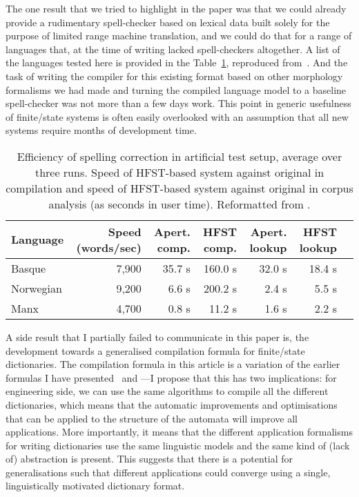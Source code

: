 \documentclass[officiallayout]{unihelcompling}
\begin{document}
The one result that we tried to highlight in the paper was that we could
already provide a rudimentary spell-checker based on lexical data built solely
for the purpose of limited range machine translation, and we could do that for
a range of languages that, at the time of writing lacked spell-checkers
altogether. A list of the languages tested here is provided in the
Table~\ref{table:lrec-2012-repro}, reproduced
from~. And the task of writing the compiler
for this existing format based on other morphology formalisms we had made and
turning the compiled language model to a baseline spell-checker was not more
than a few days work. This point in generic usefulness of finite\-/state
systems is often easily overlooked with an assumption that all new systems
require months of development time.

\begin{table}
    \centering
    \begin{scriptsize}
\begin{tabular}{|l|r|r||r|r||r|r|}
\hline
\bf Language & \bf Speed (words/sec) & \bf Apert. comp. & \bf HFST comp. & \bf Apert. lookup & \bf HFST lookup \\
\hline
Basque       &  7,900  & 35.7 s & 160.0  s & 32.0 s & 18.4 s \\
Norwegian    &  9,200  & 6.6 s  & 200.2 s  & 2.4 s  & 5.5  s \\
Manx         &  4,700  & 0.8 s  & 11.2  s  & 1.6 s  & 2.2  s \\
\hline
\end{tabular}
\end{scriptsize}
  \caption{Efficiency of spelling correction in artificial test setup, average 
  over three runs. Speed of HFST-based system against original in compilation
  and speed of HFST-based system against original in corpus analysis (as
  seconds in user time).  Reformatted from .
  \label{table:lrec-2012-repro}}
\end{table}

A side result that I partially failed to communicate in this paper is, the
development towards a generalised compilation formula for finite\-/state
dictionaries. The compilation formula in this article is a variation of the
earlier formulas I have presented~\citep{linden2009hfst} and
---I propose that this has two implications:
for engineering side, we can use the same algorithms to compile all the
different dictionaries, which means that the automatic improvements and
optimisations that can be applied to the structure of the automata will improve
all applications. More importantly, it means that the different application
formalisms for writing dictionaries use the same linguistic models and the same
kind of (lack of) abstraction is present. This suggests that there is a
potential for generalisations such that different applications could converge
using a single, linguistically motivated dictionary format.
\end{document}
